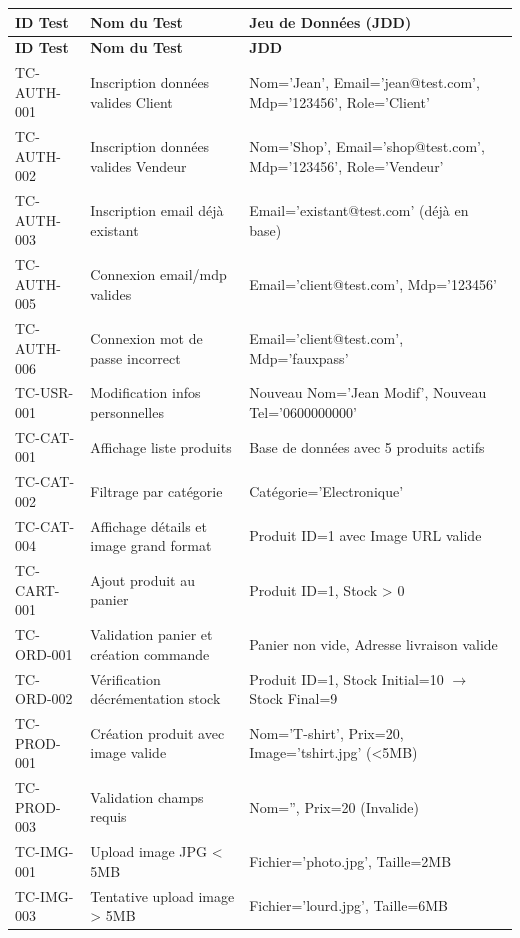 \documentclass[12pt,a4paper]{article}
\begin{document}
\begin{longtable}{|p{2.5cm}|p{4.5cm}|p{6cm}|}
    \hline
    \textbf{ID Test} & \textbf{Nom du Test} & \textbf{Jeu de Données (JDD)} \\ \hline
    \endfirsthead
    \hline
    \textbf{ID Test} & \textbf{Nom du Test} & \textbf{JDD} \\ \hline
    \endhead
    
    TC-AUTH-001 & Inscription données valides Client & Nom='Jean', Email='jean@test.com', Mdp='123456', Role='Client' \\ \hline
    TC-AUTH-002 & Inscription données valides Vendeur & Nom='Shop', Email='shop@test.com', Mdp='123456', Role='Vendeur' \\ \hline
    TC-AUTH-003 & Inscription email déjà existant & Email='existant@test.com' (déjà en base) \\ \hline
    TC-AUTH-005 & Connexion email/mdp valides & Email='client@test.com', Mdp='123456' \\ \hline
    TC-AUTH-006 & Connexion mot de passe incorrect & Email='client@test.com', Mdp='fauxpass' \\ \hline
    TC-USR-001 & Modification infos personnelles & Nouveau Nom='Jean Modif', Nouveau Tel='0600000000' \\ \hline
    TC-CAT-001 & Affichage liste produits & Base de données avec 5 produits actifs \\ \hline
    TC-CAT-002 & Filtrage par catégorie & Catégorie='Electronique' \\ \hline
    TC-CAT-004 & Affichage détails et image grand format & Produit ID=1 avec Image URL valide \\ \hline
    TC-CART-001 & Ajout produit au panier & Produit ID=1, Stock > 0 \\ \hline
    TC-ORD-001 & Validation panier et création commande & Panier non vide, Adresse livraison valide \\ \hline
    TC-ORD-002 & Vérification décrémentation stock & Produit ID=1, Stock Initial=10 $\rightarrow$ Stock Final=9 \\ \hline
    TC-PROD-001 & Création produit avec image valide & Nom='T-shirt', Prix=20, Image='tshirt.jpg' (<5MB) \\ \hline
    TC-PROD-003 & Validation champs requis & Nom='', Prix=20 (Invalide) \\ \hline
    TC-IMG-001 & Upload image JPG < 5MB & Fichier='photo.jpg', Taille=2MB \\ \hline
    TC-IMG-003 & Tentative upload image > 5MB & Fichier='lourd.jpg', Taille=6MB \\ \hline

\end{longtable}
\end{document}
